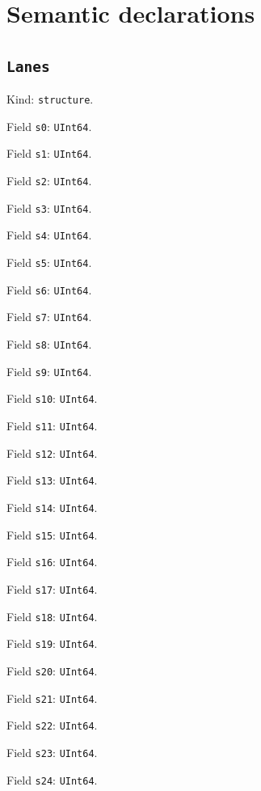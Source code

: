 \documentclass[11pt]{article}
\begin{document}
\section*{Semantic declarations}
\subsection*{\texttt{Lanes}}
\noindent Kind: \texttt{structure}.\par
\noindent Field \texttt{s0}: \texttt{UInt64}.\par
\noindent Field \texttt{s1}: \texttt{UInt64}.\par
\noindent Field \texttt{s2}: \texttt{UInt64}.\par
\noindent Field \texttt{s3}: \texttt{UInt64}.\par
\noindent Field \texttt{s4}: \texttt{UInt64}.\par
\noindent Field \texttt{s5}: \texttt{UInt64}.\par
\noindent Field \texttt{s6}: \texttt{UInt64}.\par
\noindent Field \texttt{s7}: \texttt{UInt64}.\par
\noindent Field \texttt{s8}: \texttt{UInt64}.\par
\noindent Field \texttt{s9}: \texttt{UInt64}.\par
\noindent Field \texttt{s10}: \texttt{UInt64}.\par
\noindent Field \texttt{s11}: \texttt{UInt64}.\par
\noindent Field \texttt{s12}: \texttt{UInt64}.\par
\noindent Field \texttt{s13}: \texttt{UInt64}.\par
\noindent Field \texttt{s14}: \texttt{UInt64}.\par
\noindent Field \texttt{s15}: \texttt{UInt64}.\par
\noindent Field \texttt{s16}: \texttt{UInt64}.\par
\noindent Field \texttt{s17}: \texttt{UInt64}.\par
\noindent Field \texttt{s18}: \texttt{UInt64}.\par
\noindent Field \texttt{s19}: \texttt{UInt64}.\par
\noindent Field \texttt{s20}: \texttt{UInt64}.\par
\noindent Field \texttt{s21}: \texttt{UInt64}.\par
\noindent Field \texttt{s22}: \texttt{UInt64}.\par
\noindent Field \texttt{s23}: \texttt{UInt64}.\par
\noindent Field \texttt{s24}: \texttt{UInt64}.\par
\end{document}
